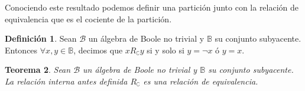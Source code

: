 \documentclass[final,12pt,a4paper,twoside,fleqn]{extbook}
\newcommand{\setB}{\ensuremath{\mathbb{B}}}
\newcommand{\algB}{\ensuremath{\mathscr{B}}}
\newtheorem{thm}{Teorema}[chapter]
\theoremstyle{definition}
\newtheorem{defn}[thm]{Definición}
\theoremstyle{remark}
\begin{document}
	Conociendo este resultado podemos definir una partición junto con la
relación de equivalencia que es el cociente de la partición.



\begin{defn}
Sean \(\algB\) un álgebra de Boole no trivial y \(\setB\) su conjunto
subyacente. Entonces \(\forall x,y \in \setB\), decimos que \(x
R_{\complement} y\) si y solo si \(y = \neg x\) ó \(y = x\).
\end{defn}



\begin{thm}
Sean \(\algB\) un álgebra de Boole no trivial y \(\setB\) su conjunto
subyacente. La relación interna antes definida \(R_{\complement}\) es una
relación de equivalencia.
\end{thm}
\end{document}
